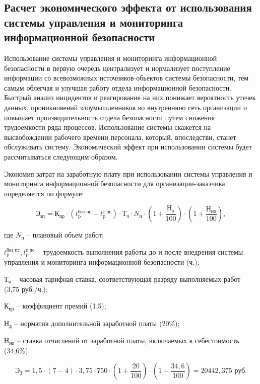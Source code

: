 \newpage

\subsection{Расчет экономического эффекта от использования системы управления и мониторинга информационной безопасности}

Использование системы управления и мониторинга информационной безопасности в первую очередь централизует и нормализует поступление информации со всевозможных источников-обьектов системы безопасности, тем самым облегчая и улучшая работу отдела информационной безопасности. Быстрый анализ инцидентов и реагирование на них понижает вероятность утечек данных, проникновений злоумышленников во внутреннюю сеть организации и повышает производительность отдела безопасности путем снижения трудоемкости ряда процессов. Использование системы скажется на высвобождении рабочего времени персонала, который,  впоследстви, станет обслуживать систему. Экономический эффект при использовании системы будет рассчитываться следующим образом.

Экономия затрат на заработную плату при использовании системы управления и мониторинга информационной безопасности для организации-заказчика определяется по формуле:

$$
    \text{Э}_{\text{зп}} = \text{К}_{\text{пр}}\cdot (t_{\text{p}}^{\text{без пс}}-t_{\text{p}}^{\text{с пс}})\cdot \text{Т}_{\text{ч}}\cdot N_{\text{п}}\cdot  (1+\frac{\text{Н}_{\text{д}}}{100})\cdot (1+\frac{\text{Н}_{\text{но}}}{100}), 
$$

где $N_{\text{п}}$ -- плановый объем работ; 

    $t_{\text{p}}^{\text{без пс}}, t_{\text{p}}^{\text{с пс}}$ -- трудоемкость выполнения работы до и после внедрения системы управления и мониторинга информационной безопасности (ч.); 
    
    $\text{Т}_{\text{ч}}$ -- часовая тарифная ставка, соответствующая разряду выполняемых работ (3,75 руб./ч.); 
    
    $\text{К}_{\text{пр}}$ -- коэффициент премий (1,5); 
    
    $\text{Н}_{\text{д}}$ -- норматив дополнительной заработной платы (20\%); 
    
    $\text{Н}_{\text{но}}$ -- ставка отчислений от заработной платы, включаемых в себестоимость (34,6\%).
 
$$
    \text{Э}_{\text{З}} = 1,5 \cdot (7-4)\cdot 3,75\cdot 750 \cdot  (1+\frac{20}{100})\cdot (1+\frac{34,6}{100}) =  20442,375 \text{ руб}.
$$
    
